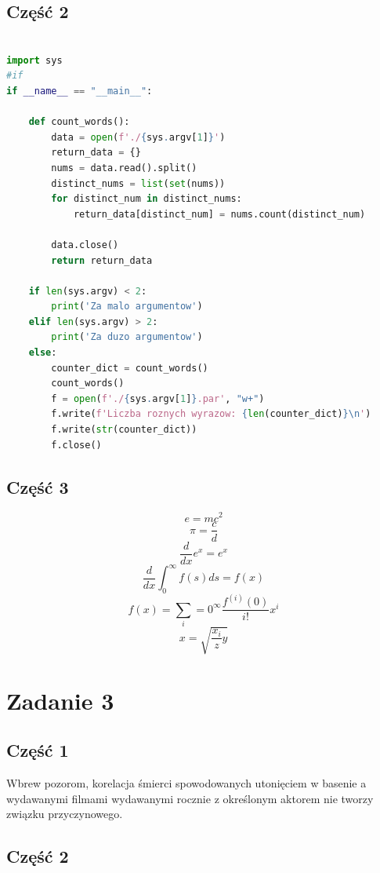 \documentclass[a4paper]{article}
\begin{document}
\subsection{Część 2}
\begin{lstlisting}[language=Python]

import sys
#if
if __name__ == "__main__":

    def count_words():
        data = open(f'./{sys.argv[1]}')
        return_data = {}
        nums = data.read().split()
        distinct_nums = list(set(nums))
        for distinct_num in distinct_nums:
            return_data[distinct_num] = nums.count(distinct_num)

        data.close()
        return return_data

    if len(sys.argv) < 2:
        print('Za malo argumentow')
    elif len(sys.argv) > 2:
        print('Za duzo argumentow')
    else:
        counter_dict = count_words()
        count_words()
        f = open(f'./{sys.argv[1]}.par', "w+")
        f.write(f'Liczba roznych wyrazow: {len(counter_dict)}\n')
        f.write(str(counter_dict))
        f.close()

\end{lstlisting}

\pagebreak
\subsection{Część 3}

$$e=mc^2$$
$$\pi=\frac{c}{d}$$
$$\frac{d}{dx}e^x=e^x$$
$$\frac{d}{dx}\int_{0}^\infty f(s)ds = f(x)$$
$$f(x) = \sum_{i} = 0^\infty\frac{f^{(i)}(0)}{i!}x^i$$
$$x = \sqrt{\frac{x_i}{z}y}$$


\section{Zadanie 3}


\subsection{Część 1}
Wbrew pozorom, korelacja śmierci spowodowanych utonięciem w basenie\cite{saluja2006swimming} a wydawanymi filmami wydawanymi rocznie z określonym aktorem\cite{fearing1947influence} nie tworzy związku przyczynowego.


\subsection{Część 2}
\printbibliography
\end{document}
